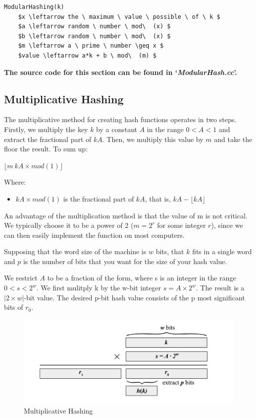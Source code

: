 \documentclass[12pt]{article}
\begin{document}
\begin{lstlisting}[mathescape=true]
ModularHashing(k)
	$x \leftarrow the \ maximum \ value \ possible \ of \ k $
	$a \leftarrow random \ number \ mod\  (x) $
	$b \leftarrow random \ number \ mod\  (x) $
	$m \leftarrow a \ prime \ number \geq x $
	$value \leftarrow a*k + b \ mod\  (m) $

\end{lstlisting}

\textbf{The source code for this section can be found in `\textit{ModularHash.cc}'.}
\bigskip

\subsection{Multiplicative Hashing}
The multiplicative method for creating hash functions operates in two steps.
Firstly, we multiply the key $k$ by a constant $A$ in the range $0<A<1$ and extract the fractional part of $kA$. Then, we multiply this value by $m$ and take the floor the result. To sum up:  

\begin{center}
 $ \lfloor m\ kA \times mod(1)  \rfloor$
\end{center}
Where:
\begin{itemize}
\item $kA  \times mod(1)$  is the fractional part of $kA$, that is, $kA- \lfloor kA \rfloor$
\end{itemize}
An advantage of the multiplication method is that the value of m is not critical. We typically choose it to be a power of 2 ($m = 2^r$ for some integer $r$), since we can then easily implement the function on most computers.

\vspace{0.4cm}
Supposing that the word size of the machine is $w$ bits, that $k$ fits in a single word and $p$ is the number of bits that you want for the size of your hash value.

 We restrict $A$ to be a fraction of the form, where s is an integer in the range $0<s<2^w$. We first mulitply k by the w-bit integer $s = A\times 2^w$. The result is a $|2 \times w| $-bit value. The desired p-bit hash value consists of the p most significant bits of $r_0$. 


\begin{figure}[H]
	\centering
	\includegraphics[scale=0.7]{graphs/MultiplicativeHashingDiagram.pdf}
	\caption{Multiplicative Hashing}
	\label{fig:MultiplicativeHashing}
\end{figure}
\end{document}
